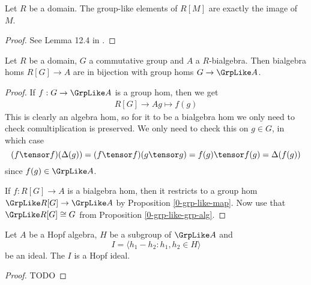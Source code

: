 \begin{lemma}
  \label{0-grp-like-grp-alg}
  \leanok

  Let $R$ be a domain.
  The group-like elements of $R[M]$ are exactly the image of $M$.
\end{lemma}
\begin{proof}
  \leanok

  See Lemma 12.4 in \cite{Milne_2017}.
\end{proof}


\begin{proposition}
  \label{0-grp-alg-grp-like-gc}

  Let $R$ be a domain, $G$ a commutative group and $A$ a $R$-bialgebra.
  Then bialgebra homs $R[G] \to A$ are in bijection with group homs $G \to \GrpLike A$.
\end{proposition}
\begin{proof}

  If $f : G \to \GrpLike A$ is a group hom, then we get
  \begin{align*}
    R[G] \to A
    g \mapsto f(g)
  \end{align*}
  This is clearly an algebra hom,
  so for it to be a bialgebra hom we only need to check comultiplication is preserved.
  We only need to check this on $g \in G$, in which case
  \[(f \tensor f)(\Delta(g)) = (f \tensor f)(g \tensor g) = f(g) \tensor f(g) = \Delta(f(g))\]
  since $f(g) \in \GrpLike A$.

  If $f : R[G] \to A$ is a bialgebra hom,
  then it restricts to a group hom $\GrpLike R[G] \to \GrpLike A$
  by Proposition \ref{0-grp-like-map}.
  Now use that $\GrpLike R[G] \cong G$ from Proposition \ref{0-grp-like-grp-alg}.
\end{proof}


\begin{proposition}
  \label{0-grp-like-quot-hopf}

  Let $A$ be a Hopf algebra, $H$ be a subgroup of $\GrpLike A$ and
  \[
    I = \langle h_1 - h_2 : h_1,h_2 \in H \rangle
  \]
  be an ideal. The $I$ is a Hopf ideal.
\end{proposition}
\begin{proof}
  \uses{}

  TODO
\end{proof}


